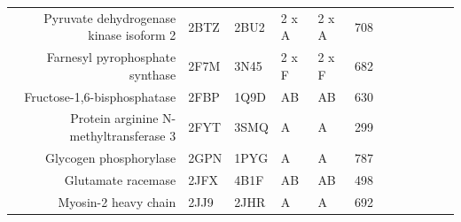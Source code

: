 \begin{table}
\begin{scriptsize}
\begin{tabular}{rrrrrrrrrrrr}
\multicolumn{1}{r}{Pyruvate dehydrogenase kinase isoform 2} & \multicolumn{1}{l}{2BTZ} & \multicolumn{1}{l}{2BU2} & \multicolumn{1}{l}{2 x A} & \multicolumn{1}{l}{2 x A} & 708   & \cellcolor[rgb]{ 1,  .494,  .475}  & \cellcolor[rgb]{ 1,  .494,  .475}  & \cellcolor[rgb]{ 1,  .494,  .475}  & \cellcolor[rgb]{ 1,  .494,  .475}  & \cellcolor[rgb]{ 1,  .494,  .475}  & \cellcolor[rgb]{ 1,  .494,  .475}  \\
\multicolumn{1}{r}{Farnesyl pyrophosphate synthase} & \multicolumn{1}{l}{2F7M} & \multicolumn{1}{l}{3N45} & \multicolumn{1}{l}{2 x F} & \multicolumn{1}{l}{2 x F} & 682   & \cellcolor[rgb]{ .573,  .816,  .314}  & \cellcolor[rgb]{ .573,  .816,  .314}  & \cellcolor[rgb]{ 1,  .494,  .475}  & \cellcolor[rgb]{ 1,  .494,  .475}  & \cellcolor[rgb]{ .573,  .816,  .314}  & \cellcolor[rgb]{ 1,  .494,  .475}  \\
\multicolumn{1}{r}{Fructose-1,6-bisphosphatase} & \multicolumn{1}{l}{2FBP} & \multicolumn{1}{l}{1Q9D} & \multicolumn{1}{l}{AB} & \multicolumn{1}{l}{AB} & 630   & \cellcolor[rgb]{ 1,  .494,  .475}  & \cellcolor[rgb]{ 1,  .494,  .475}  & \cellcolor[rgb]{ .573,  .816,  .314}  & \cellcolor[rgb]{ 1,  .494,  .475}  & \cellcolor[rgb]{ 1,  .494,  .475}  & \cellcolor[rgb]{ 1,  .494,  .475}  \\
\multicolumn{1}{r}{Protein arginine N-methyltransferase 3} & \multicolumn{1}{l}{2FYT} & \multicolumn{1}{l}{3SMQ} & \multicolumn{1}{l}{A} & \multicolumn{1}{l}{A} & 299   & \cellcolor[rgb]{ 1,  .494,  .475}  & \cellcolor[rgb]{ .573,  .816,  .314}  & \cellcolor[rgb]{ .573,  .816,  .314}  & \cellcolor[rgb]{ 1,  .494,  .475}  & \cellcolor[rgb]{ .573,  .816,  .314}  & \cellcolor[rgb]{ .573,  .816,  .314}  \\
\multicolumn{1}{r}{Glycogen phosphorylase} & \multicolumn{1}{l}{2GPN} & \multicolumn{1}{l}{1PYG} & \multicolumn{1}{l}{A} & \multicolumn{1}{l}{A} & 787   & \cellcolor[rgb]{ .573,  .816,  .314}  & \cellcolor[rgb]{ 1,  .494,  .475}  & \cellcolor[rgb]{ 1,  .494,  .475}  & \cellcolor[rgb]{ 1,  .494,  .475}  & \cellcolor[rgb]{ 1,  .494,  .475}  & \cellcolor[rgb]{ 1,  .494,  .475}  \\
\multicolumn{1}{r}{Glutamate racemase} & \multicolumn{1}{l}{2JFX} & \multicolumn{1}{l}{4B1F} & \multicolumn{1}{l}{AB} & \multicolumn{1}{l}{AB} & 498   & \cellcolor[rgb]{ 1,  .494,  .475}  & \cellcolor[rgb]{ 1,  .494,  .475}  & \cellcolor[rgb]{ 1,  .494,  .475}  & \cellcolor[rgb]{ 1,  .494,  .475}  & \cellcolor[rgb]{ 1,  .494,  .475}  & \cellcolor[rgb]{ 1,  .494,  .475}  \\
\multicolumn{1}{r}{Myosin-2 heavy chain} & \multicolumn{1}{l}{2JJ9} & \multicolumn{1}{l}{2JHR} & \multicolumn{1}{l}{A} & \multicolumn{1}{l}{A} & 692   & \cellcolor[rgb]{ .573,  .816,  .314}  & \cellcolor[rgb]{ .573,  .816,  .314}  & \cellcolor[rgb]{ .573,  .816,  .314}  & \cellcolor[rgb]{ .573,  .816,  .314}  & \cellcolor[rgb]{ .573,  .816,  .314}  & \cellcolor[rgb]{ .573,  .816,  .314}  \\

\end{tabular}
\end{scriptsize}
\end{table}
